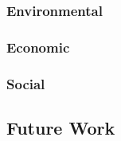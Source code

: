 \subsubsection*{Environmental}
\begin{comment}
- mer lukkede hogstformer og mindre bruk av flatehogst 
- **lavere drivstofforbruk og smartere kjøring med skogsmaskin** 
    - **lavere førerbelastning**
    - **mindre terrengslitasje**
    - **høyere produktivitet**
- produsere tømmer som er mest mulig tilpasset industriens behov 
- **videreutvikle teknologi for driftsoppfølging og førerstøtte for maskinførerne** 

###########################
FNs Bærekraftsmål som virker relevante (KANSKJE SAMMENLIGN MED HVA NORGE GJØR I DAG?):
- 9
- 12 (?) VIRKER SOM DEN FOKUSERER MEST PÅ UTVIKLINGSLAND?
- 15 (?)
\end{comment}
\subsubsection*{Economic}
\subsubsection*{Social}
\subsection{Future Work}